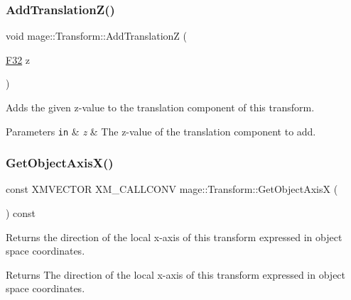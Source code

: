 \subsubsection{\texorpdfstring{Add\+Translation\+Z()}{AddTranslationZ()}}
{\footnotesize\ttfamily void mage\+::\+Transform\+::\+Add\+TranslationZ (\begin{DoxyParamCaption}\item[{\mbox{\hyperlink{namespacemage_aa97e833b45f06d60a0a9c4fc22ae02c0}{F32}}}]{z }\end{DoxyParamCaption})\hspace{0.3cm}{\ttfamily [noexcept]}}

Adds the given z-\/value to the translation component of this transform.


\begin{DoxyParams}[1]{Parameters}
\mbox{\tt in}  & {\em z} & The z-\/value of the translation component to add. \\
\hline
\end{DoxyParams}
\mbox{\label{classmage_1_1_transform_a22ac692a1ff459dc85950e2810c34de9}} 
\subsubsection{\texorpdfstring{Get\+Object\+Axis\+X()}{GetObjectAxisX()}}
{\footnotesize\ttfamily const X\+M\+V\+E\+C\+T\+OR X\+M\+\_\+\+C\+A\+L\+L\+C\+O\+NV mage\+::\+Transform\+::\+Get\+Object\+AxisX (\begin{DoxyParamCaption}{ }\end{DoxyParamCaption}) const\hspace{0.3cm}{\ttfamily [noexcept]}}

Returns the direction of the local x-\/axis of this transform expressed in object space coordinates.

\begin{DoxyReturn}{Returns}
The direction of the local x-\/axis of this transform expressed in object space coordinates. 
\end{DoxyReturn}
\mbox{\label{classmage_1_1_transform_a11db94a3ba905405cccfd5f0e5ecf6d2}} 
